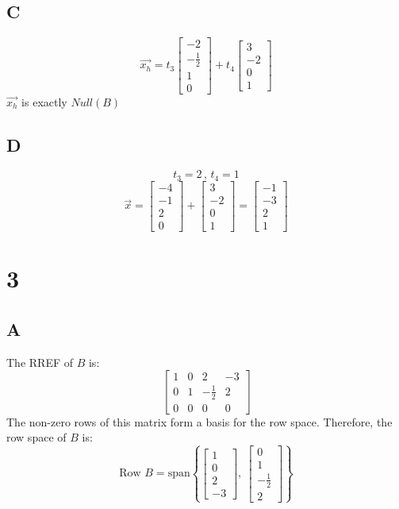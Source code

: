 \documentclass{article}
\begin{document}
\subsection*{C}

\[
	\vec{x_h} =t_3
	\begin{bmatrix}
		-2           \\
		-\frac{1}{2} \\
		1            \\
		0
	\end{bmatrix}+
	t_4
	\begin{bmatrix}
		3  \\
		-2 \\
		0  \\
		1
	\end{bmatrix}
\]
\(\vec{x_h}\) is exactly \(Null(B)\)

\subsection*{D}

\[
	t_3 = 2 \, , \, t_4 = 1
\]
\[
	\vec{x}=
	\begin{bmatrix}
		-4 \\-1\\2\\0
	\end{bmatrix}+
	\begin{bmatrix}
		3 \\-2\\0\\1
	\end{bmatrix}
	=
	\begin{bmatrix}
		-1 \\-3\\2\\1
	\end{bmatrix}
\]

\section*{3}

\subsection*{A}
The RREF of \(B\) is:
\[
\begin{bmatrix}
1 & 0 & 2 & -3 \\
0 & 1 & -\frac{1}{2} & 2 \\
0 & 0 & 0 & 0
\end{bmatrix}
\]
The non-zero rows of this matrix form a basis for the row space. Therefore, the row space of \(B\) is:
\[
\text{Row } B = \text{span} \left\{ 
\begin{bmatrix} 1 \\ 0 \\ 2 \\ -3 \end{bmatrix}, \ 
\begin{bmatrix} 0 \\ 1 \\ -\frac{1}{2} \\ 2 \end{bmatrix} 
\right\}
\]
\end{document}
